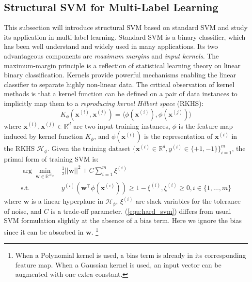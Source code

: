 \subsection{Structural SVM for Multi-Label Learning}
\label{subsec:SSVM}
This subsection will introduce structural SVM based on standard SVM and study its application 
in multi-label learning. 
Standard SVM is a binary classifier, which has been well 
understand and widely used in many applications.  
Its two advantageous components are \emph{maximum margins} and \emph{input kernels}. 
The maximum-margin principle is a reflection of statistical learning theory \citep{Vapnik} on 
linear binary classification. 
Kernels provide powerful mechanisms enabling the linear classifier to separate highly non-linear data. 
The critical observation of kernel methods is that a kernel function can be defined on a pair of data 
instances to implicitly map them to a \emph{reproducing kernel Hilbert space} (RKHS):   
\begin{equation}
    K_\phi(\mathbf{x}^{(i)},\mathbf{x}^{(j)})=\langle \phi(\mathbf{x}^{(i)}),\phi(\mathbf{x}^{(j)}) \rangle
 \label{equ:kernel_trick}
\end{equation}
where $\mathbf{x}^{(i)}, \mathbf{x}^{(j)}\in\mathbb{R}^d$ are two input training instances, $\phi$ is the feature map induced by kernel function $K_\phi$, and $\phi(\mathbf{x}^{(i)})$ is the 
representation of 
$\mathbf{x}^{(i)}$ in the RKHS $\mathcal{H}_\phi$.
Given the training dataset $\{\mathbf{x}^{(i)}\in\mathbb{R}^d,y^{(i)}\in\{+1,-1\}\}_{i=1}^m$, the primal form of training SVM is:
\begin{equation}
\begin{array}{rl} 
    \displaystyle \arg\min_{ \mathbf{w} \in \mathbb{R}^{\mathcal{H_{\phi}}}}   & \frac{1}{2} ||\mathbf{w}||^2+C\sum_{i=1}^m \xi^{(i)} \\
    \text{s.t.} & y^{(i)} \left(\mathbf{w}^\top \phi (\mathbf{x}^{(i)})\right) \geq 1-\xi^{(i)}, \xi^{(i)} \geq 0,  i\in \{1,\dots,m\}
\end{array}
\label{equ:hard_svm}
\end{equation}
where $\mathbf{w}$ is a linear hyperplane in $\mathcal{H}_\phi$, $\xi^{(i)}$ are slack variables for the tolerance of noise, and $C$ is a trade-off parameter. 
(\ref{equ:hard_svm}) differs from usual SVM formulation slightly at the absence of a bias term. Here we ignore the bias since 
it can be absorbed in $\mathbf{w}$. 
\footnote{When a Polynomial kernel is used, a bias term is already in its corresponding feature map. When a Gaussian kernel is used, an input vector can be 
augmented with one extra constant.}


